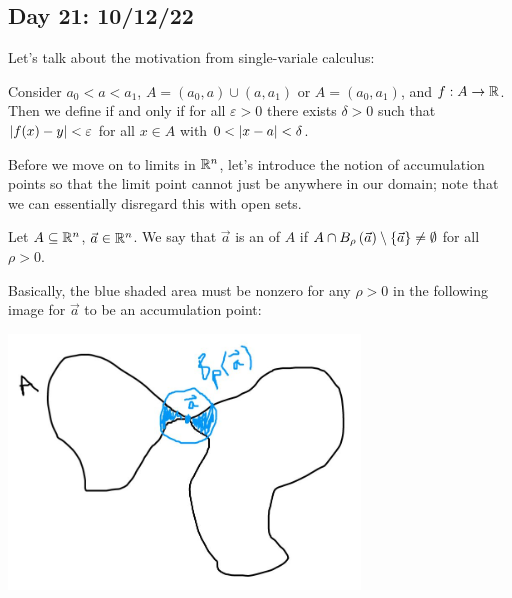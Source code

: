 \documentclass[main.tex]{subfiles}
\begin{document}
\subsection{Day 21: 10/12/22}
Let's talk about the motivation from single-variale calculus:

\begin{definition}
    Consider $a_0 < a < a_1$, $A = (a_0, a) \cup (a, a_1)$ or $A = (a_0, a_1)$, and $f : A \to \mathbb R$. Then we define  if and only if for all $\varepsilon > 0$ there exists $\delta > 0$ such that $\left\lvert f(x) - y \right\rvert < \varepsilon$ for all $x\in A$ with $0 < \left\lvert x - a \right\rvert < \delta$.
\end{definition}

Before we move on to limits in $\mathbb R^n$, let's introduce the notion of accumulation points so that the limit point cannot just be anywhere in our domain; note that we can essentially disregard this with open sets.

\begin{definition}
    Let $A\subseteq \mathbb R^n$, $\vec{a}\in \mathbb R^n$. We say that $\vec{a}$ is an  of $A$ if $A\cap B_\rho\left( \vec{a} \right)\setminus \left\{ \vec{a} \right\} \neq \emptyset$ for all $\rho > 0$.
\end{definition}

Basically, the blue shaded area must be nonzero for any $\rho > 0$ in the following image for $\vec{a}$ to be an accumulation point:

\begin{center}
    \includegraphics[width = 0.7\textwidth]{accumulation_point.JPG}    
\end{center}
\end{document}
